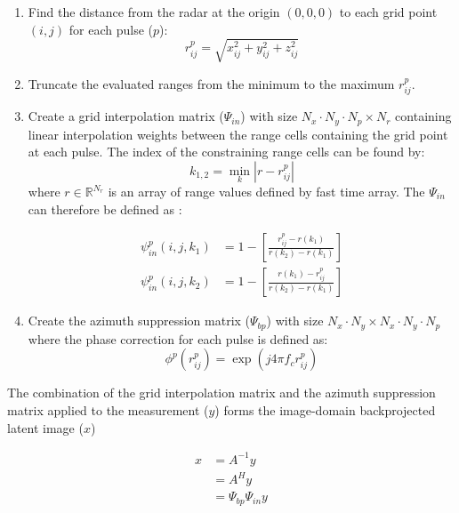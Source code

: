 \documentclass[conference]{IEEEtran}
\begin{document}
\begin{enumerate}
    \item Find the distance from the radar at the origin $(0,0,0)$ to each grid point $(i,j)$ for each pulse ($p$): 
    \begin{equation}
        r_{ij}^{p} = \sqrt{x_{ij}^{2} + y_{ij}^{2} + z_{ij}^{2}}
    \end{equation}
    \item Truncate the evaluated ranges from the minimum to the maximum $r_{ij}^{p}$.
    \item Create a grid interpolation matrix ($\Psi_{in}$) with size $N_{x}\cdot N_{y} \cdot N_{p} \times N_{r}$ containing linear interpolation weights between the range cells containing the grid point at each pulse. The index of the constraining range cells can be found by:
    \begin{equation}
        k_{1,2} = \min_{k} |r - r_{ij}^{p}|
    \end{equation}
    \noindent where $r \in \mathbb{R}^{N_{r}}$ is an array of range values defined by fast time array. The $\Psi_{in}$ can therefore be defined as \cite{Focsa_2021}:
    
    \begin{equation}
        \begin{aligned}
            \psi_{in}^{p}(i,j,k_{1}) &= 1-\left[ \frac{r_{ij}^{p} - r(k_{1})}{r(k_{2}) - r(k_{1})} \right]\\
            \psi_{in}^{p}(i,j,k_{2}) &=1-\left[\frac{r(k_{1}) - r_{ij}^{p}}{r(k_{2}) - r(k_{1})} \right]
        \end{aligned}
    \end{equation}

    \item Create the azimuth suppression matrix ($\Psi_{bp}$) with size $N_{x} \cdot N_{y} \times N_{x} \cdot N_{y} \cdot N_{p}$ where the phase correction for each pulse is defined as:
    \begin{equation}
        \phi^{p}(r_{ij}^{p}) = \exp(j4\pi f_{c} r_{ij}^{p})
    \end{equation}
\end{enumerate}

The combination of the grid interpolation matrix and the azimuth suppression matrix applied to the measurement ($y$) forms the image-domain backprojected latent image ($x$)

\begin{equation}
    \begin{aligned}
        x &= A^{-1}y \\
         &= A^{H}y\\
         &= \Psi_{bp} \Psi_{in} y
    \end{aligned}
    \label{eq:Ah}
\end{equation}
\end{document}
